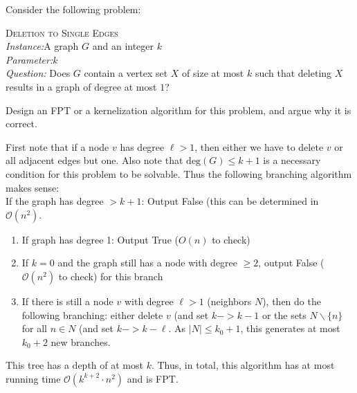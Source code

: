 \documentclass{article}
\begin{document}
\begin{exercise}
    Consider the following problem:
    \begin{mdframed} \textsc{Deletion to Single Edges} \\
        \textit{Instance:}A graph $G$ and an integer $k$\\
\textit{Parameter:}$k$\\
\textit{Question:} Does $G$ contain a vertex set $X$ of size at most $k$ such that deleting $X$ results in a graph of degree at most $1$?
  \end{mdframed}
  Design an FPT or a kernelization algorithm for this problem, and argue why it is correct.
\end{exercise}
\begin{solving}
    First note that if a node $v$ has degree $\ell>1$, then either we have to delete $v$ or all adjacent edges but one. Also note that $\mathrm{deg}(G)\leq k+1$ is a necessary condition for this problem to be solvable. Thus the following branching algorithm makes sense:\\
    If the graph has degree $> k+1$: Output False (this can be determined in $\mathcal O(n^2)$.\begin{enumerate}
        \item If graph has degree 1: Output True ($O(n)$ to check)
        \item If $k = 0$ and the graph still has a node with degree $\geq 2$, output False ($\mathcal O(n^2)$ to check) for this branch
        \item If there is still a node $v$ with degree $\ell>1$ (neighbors $N$), then do the following branching: either delete $v$ (and set $k->k-1$ or the sets $N\backslash\{n\}$ for all $n\in N$ (and set $k-> k-\ell$. As $|N|\leq k_0+1$, this generates at most $k_0+2$ new branches. 
    \end{enumerate}
    This tree has a depth of at most $k$. Thus, in total, this algorithm has at most running time $\mathcal O(k^{k+2}\cdot n^2)$ and is FPT.
\end{solving}
\newpage
\end{document}
